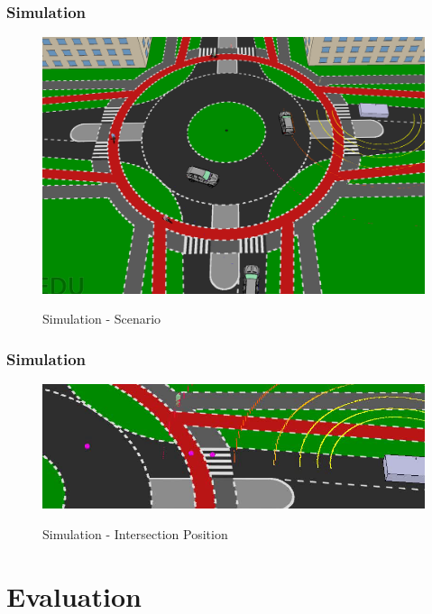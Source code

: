 \documentclass[nosymbols]{beamer}	%
\begin{document}
\begin{frame}
\frametitle{Simulation}
\begin{figure}[!ht]
\begin{center}
\caption{Simulation - Scenario}
\includegraphics[width=\textwidth,height=0.7\textheight,keepaspectratio]{bilder/scenario.png}
\label{obst_cases}
\end{center}
\end{figure}
\end{frame}


\begin{frame}
\frametitle{Simulation}
\begin{figure}[!ht]
\begin{center}
\caption{Simulation - Intersection Position}
\includegraphics[width=\textwidth,height=0.7\textheight,keepaspectratio]{bilder/intersection_pos.png}
\label{obst_cases}
\end{center}
\end{figure}
\end{frame}


\section{Evaluation}
\end{document}
